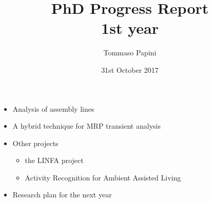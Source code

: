 
\title[PhD Progress Report: 1st year]{
  PhD Progress Report\\
  1st year
}
\author{
  Tommaso Papini
}
\date{
  31st October 2017
}
  
\begin{frame}
  \titlepage
  
  \begin{itemize}
    \item Analysis of assembly lines
    \item A hybrid technique for MRP transient analysis
    \item Other projects
    \begin{itemize}
      \item the LINFA project
      \item Activity Recognition for Ambient Assisted Living
    \end{itemize}
    \item Research plan for the next year
  \end{itemize}
\end{frame}